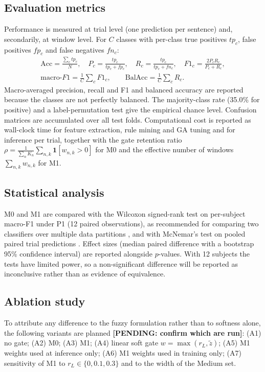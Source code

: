 \documentclass[11pt,a4paper]{article}
\newcommand{\pending}[1]{\textcolor{red!75!black}{\textbf{[PENDING: #1]}}}
\begin{document}
\subsection{Evaluation metrics}
Performance is measured at trial level (one prediction per sentence) and, secondarily, at window level. For $C$ classes with per-class true positives $tp_c$, false positives $fp_c$ and false negatives $fn_c$:
\begin{gather}
\mathrm{Acc} = \frac{\sum_c tp_c}{N},\quad
P_c = \frac{tp_c}{tp_c+fp_c},\quad
R_c = \frac{tp_c}{tp_c+fn_c},\quad
F1_c = \frac{2P_cR_c}{P_c+R_c},\\
\text{macro-}F1 = \frac{1}{C}\sum_{c}F1_c,\qquad
\text{BalAcc} = \frac{1}{C}\sum_c R_c .
\end{gather}
Macro-averaged precision, recall and F1 and balanced accuracy are reported because the classes are not perfectly balanced. The majority-class rate (35.0\% for positive) and a label-permutation test give the empirical chance level. Confusion matrices are accumulated over all test folds. Computational cost is reported as wall-clock time for feature extraction, rule mining and GA tuning and for inference per trial, together with the gate retention ratio $\rho=\frac{1}{\sum_n K_n}\sum_{n,k}\mathbf{1}[w_{n,k}>0]$ for M0 and the effective number of windows $\sum_{n,k}w_{n,k}$ for M1.

\subsection{Statistical analysis}
M0 and M1 are compared with the Wilcoxon signed-rank test on per-subject macro-F1 under P1 (12 paired observations), as recommended for comparing two classifiers over multiple data partitions \cite{Demsar2006}, and with McNemar's test on pooled paired trial predictions \cite{McNemar1947}. Effect sizes (median paired difference with a bootstrap 95\% confidence interval) are reported alongside $p$-values. With 12 subjects the tests have limited power, so a non-significant difference will be reported as inconclusive rather than as evidence of equivalence.

\subsection{Ablation study}
\label{sec:ablation}
To attribute any difference to the fuzzy formulation rather than to softness alone, the following variants are planned \pending{confirm which are run}: (A1) no gate; (A2) M0; (A3) M1; (A4) linear soft gate $w=\max(r_L,\tilde z)$; (A5) M1 weights used at inference only; (A6) M1 weights used in training only; (A7) sensitivity of M1 to $r_L\in\{0,0.1,0.3\}$ and to the width of the Medium set.
\end{document}
